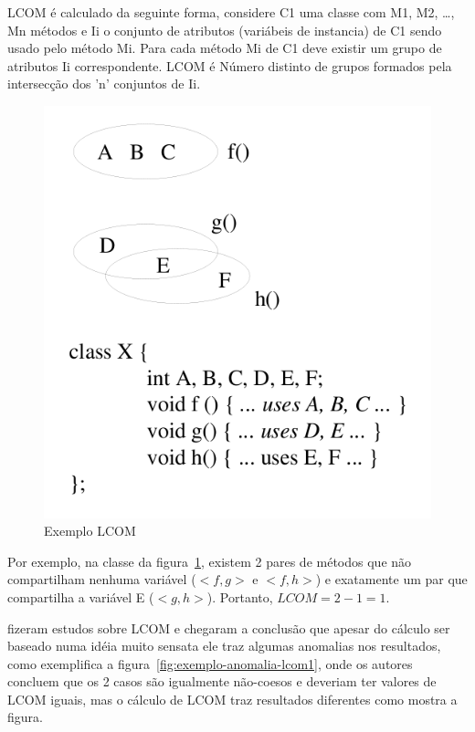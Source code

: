 LCOM é calculado da seguinte forma, considere C1 uma classe com M1, M2,
\ldots, Mn métodos e Ii o conjunto de atributos (variábeis de instancia) de C1
sendo usado pelo método Mi. Para cada método Mi de C1 deve existir um grupo de
atributos Ii correspondente. LCOM é Número distinto de grupos formados pela
intersecção dos 'n' conjuntos de Ii.

\begin{figure}[h]
\center
\includegraphics[scale=0.4]{imagens/exemplo-lcom1-hitz-e-montazeri}
\caption{Exemplo LCOM \cite{measuringCouplingAndCohesion}}
\label{fig:exemplo-lcom1}
\end{figure}

Por exemplo, na classe da figura~\ref{fig:exemplo-lcom1}, existem 2 pares de
métodos que não compartilham nenhuma variável ($<f, g>$ e $<f, h>$) e
exatamente um par que compartilha a variável E ($<g, h>$). Portanto, $LCOM = 2
- 1 = 1$.

 fizeram estudos sobre
LCOM e chegaram a conclusão que apesar do cálculo ser baseado numa idéia
muito sensata ele traz algumas anomalias nos resultados, como exemplifica a
figura~\ref{fig:exemplo-anomalia-lcom1}, onde os autores concluem que os 2
casos são igualmente não-coesos e deveriam ter valores de LCOM iguais, mas
o cálculo de LCOM traz resultados diferentes como mostra a figura.

